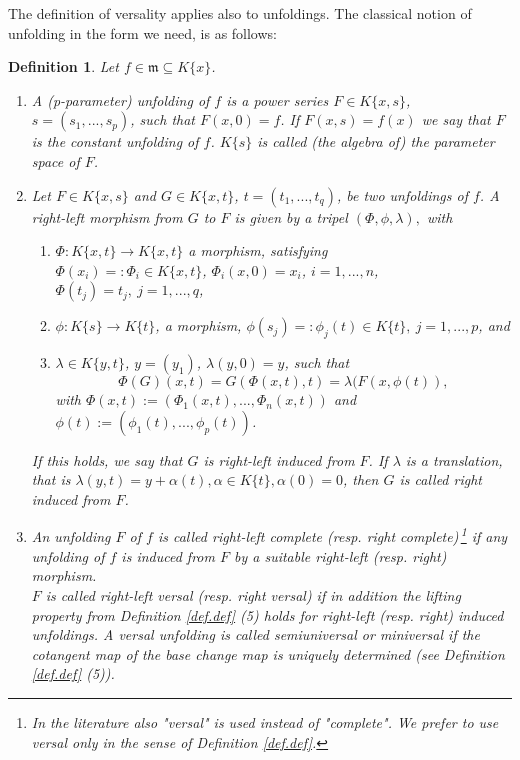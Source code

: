 \documentclass[11pt]{article}
\newtheorem{Definition}{Definition}[section]
\newcommand{\fm}{\mathfrak{m}}
\begin{document}
 The definition of versality applies also to unfoldings.
The classical notion of unfolding in the form we need, is as follows:

\begin{Definition} \label {def.unf}
 Let $f \in \fm \subseteq K\{x\}$. 
 \begin{enumerate}
 \item A {\em (p-parameter) unfolding} of $f$ is a power series 
 $F \in K\{x,s\}$, $s= (s_1,...,s_p)$, such that $F(x, 0) =f$. 
If $F(x,s) = f(x)$ we say that $F$ is the {\em constant unfolding} of $f$. $K\{s\}$ is called (the algebra of) the {\em parameter space} of $F$.
  \item Let $F \in K\{x,s\}$ and $G \in K\{x,t\}$, $t = (t_1,...,t_q)$,
 be two unfoldings of $f$. 
 A {\em right-left morphism from $G$ to $F$} is given by a tripel
 $(\Phi, \phi,\lambda),$ with
 \begin{enumerate}
  \item [(i)] $\Phi : K\{x,t\} \to K\{x,t\}$ a morphism, satisfying\\
  $\Phi(x_i) =: \Phi_i \in K\{x,t\}$, $\Phi_i(x,0) = x_i$, $i=1,...,n$,\\
  $\Phi(t_j) = t_j, \ j=1,...,q$,
 \item [(ii)] $\phi : K\{s\} \to K\{t\}$, a morphism, $\phi(s_j) =: \phi_j(t) \in K\{t \}, \ j=1,...,p$,   and   
\item [(iii)] $\lambda \in  K\{y,t\}$, $y=(y_1)$, $\lambda(y,0) = y$,   such that 
 $$\Phi(G)(x,t)= G(\Phi(x,t),t)  = \lambda(F(x,\phi(t)),$$
with $\Phi(x,t):=(\Phi_1(x,t),...,\Phi_n(x,t))$ and $\phi(t):=(\phi_1(t),...,\phi_p(t))$.
   \end{enumerate}
 If this holds, we say that  $G$ is {\em right-left induced}  from $F$.  If $\lambda$ is a translation, that is $\lambda(y,t) = y + \alpha(t),  \alpha \in K\{t\}, \alpha(0)=0$, then $G$ is called {\em right induced}  from $F$.
\item  An unfolding $F$ of $f$ is called {\em  right-left complete}  (resp. {\em right complete})\,\footnote{In the literature also "versal"
is used instead of "complete". We prefer to use versal only in the sense of Definition \ref{def.def}.}  if any unfolding of $f$ is induced from $F$ by a suitable right-left (resp. right) morphism. \\
$F$ is called {\em right-left versal} (resp. {\em right versal}) if in addition the lifting property from Definition \ref{def.def} (5) holds for right-left (resp. right) induced unfoldings.
A versal unfolding is called {\em semiuniversal} or {\em miniversal} if the cotangent map of the base change map is uniquely determined (see Definition \ref{def.def} (5)). 
 \end{enumerate}
 \end{Definition} 
\end{document}
